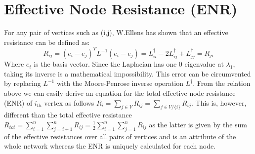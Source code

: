\documentclass{article}
\begin{document}
	\section{Effective Node Resistance (ENR)}
	For any pair of vertices such as (i,j), W.Ellens \cite{ellens2013graph} has shown that an effective resistance can be defined as:
	\begin{equation}
		R_{ij} = (e_i-e_j)^T  L^{-1} (e_i-e_j) = L_{ii}^{\dag} -2L_{ij}^{\dag} + L_{jj}^{\dag}= R_{ji}
	\end{equation}
	Where $e_i$ is the basis vector. Since the Laplacian has one 0 eigenvalue at $\lambda_1$, taking its inverse is a mathematical impossibility. This error can be circumvented by replacing $L^{-1}$ with the Moore-Penrose inverse operation $L^\dag$. From the relation above we can easily derive an equation for the total effective node resistance (ENR) of $i_{th}$ vertex as follows $R_i = \sum_{j\in V}R_{ij} = \sum_{j\in V/ \{i\}} R_{ij}$. This is, however, different than the total effective resistance $R_{tot}= \sum_{i=1}^{n}\sum_{j=i+1}^{n}R_{ij} = \frac{1}{2}\sum_{i=1}^{n}\sum_{j=1}^{n}R_{ij}$ as the latter is given by the sum of the effective resistances over
	all pairs of vertices and is an attribute of the whole network whereas the ENR is uniquely calculated for each node.
	
\end{document}
